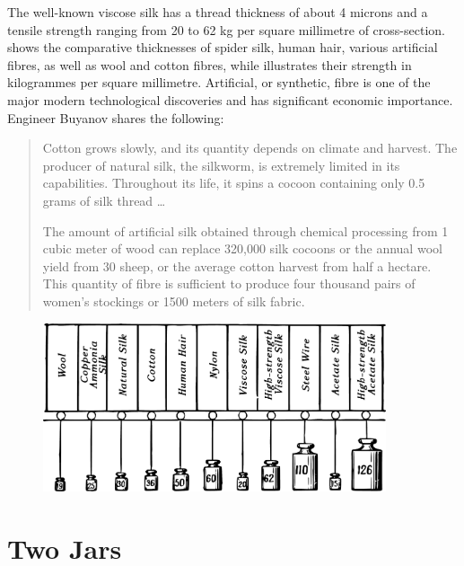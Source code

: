 The well-known viscose silk has a thread thickness of about 4 microns and a tensile strength ranging from 20 to 62 kg per square millimetre of cross-section.  shows the comparative thicknesses of spider silk, human hair, various artificial fibres, as well as wool and cotton fibres, while  illustrates their strength in kilogrammes per square millimetre. Artificial, or synthetic, fibre is one of the major modern technological discoveries and has significant economic importance. Engineer Buyanov shares the following:
\begin{quote}
Cotton grows slowly, and its quantity depends on climate and harvest. The producer of natural silk, the silkworm, is extremely limited in its capabilities. Throughout its life, it spins a cocoon containing only 0.5 grams of silk thread \dots{}

The amount of artificial silk obtained through chemical processing from 1 cubic meter of wood can replace 320,000 silk cocoons or the annual wool yield from 30 sheep, or the average cotton harvest from half a hectare. This quantity of fibre is sufficient to produce four thousand pairs of women's stockings or 1500 meters of silk fabric.
\end{quote}
\begin{figure}[h!]
\centering
\includegraphics[width=0.9\textwidth]{figures/ch-11/fig-164a.pdf}
\end{figure}





\section{Two Jars}
\label{sec-11.4}




